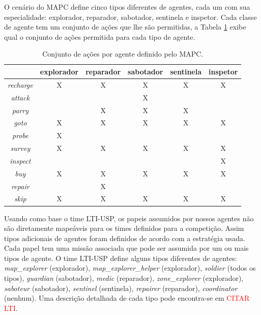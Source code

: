 \documentclass{llncs}
\begin{document}
O cenário do MAPC define cinco tipos diferentes de agentes, cada um com sua especialidade: explorador, reparador, sabotador, sentinela e inspetor. Cada classe de agente tem um conjunto de ações que lhe são permitidas, a Tabela \ref{table:tab1} exibe qual o conjunto de ações permitida para cada tipo de agente.

\begin{table}[h]
\centering
\begin{tabular}{|c|c|c|c|c|c|}
	\hline
	         & explorador & reparador & sabotador & sentinela & inspetor \\ \hline
	\textit{recharge} &      X      &     X      &     X      &    X       & X \\ \hline
  \textit{attack}  &            &           &     X      &           &  \\ \hline
  \textit{parry}   &            &     X      &    X       &    X       &  \\ \hline
  \textit{goto}   &     X       &     X      &   X        &    X       & X  \\ \hline
  \textit{probe}   &     X       &           &           &           &  \\ \hline
  \textit{survey}  &      X      &     X      &    X       &    X       & X \\ \hline
  \textit{inspect}  &            &           &           &           &  X\\ \hline
  \textit{buy}    &     X       &     X      &     X      &   X        & X \\ \hline
  \textit{repair}  &            &      X     &           &           &  \\ \hline
  \textit{skip}   &    X        &     X      &    X       &   X        & X \\ \hline
\end{tabular}
\caption{Conjunto de ações por agente definido pelo MAPC.}
\label{table:tab1}
\end{table}

Usando como base o time LTI-USP, os papeis assumidos por nossos agentes não são diretamente mapeáveis para os times definidos para a competição. Assim tipos adicionais de agentes foram definidos de acordo com a estratégia usada. Cada papel tem uma missão associada que pode ser assumida por um ou mais tipos de agente. O time LTI-USP define alguns tipos diferentes de agentes: \textit{map\_explorer} (explorador), \textit{map\_explorer\_helper} (explorador), \textit{soldier} (todos os tipos), \textit{guardian} (sabotador), \textit{medic} (reparador), \textit{zone\_explorer} (explorador), \textit{saboteur} (sabotador), \textit{sentinel} (sentinela), \textit{repairer} (reparador), \textit{coordinator} (nenhum). Uma descrição detalhada de cada tipo pode encontra-se em \textcolor{red}{CITAR LTI}.
\end{document}

